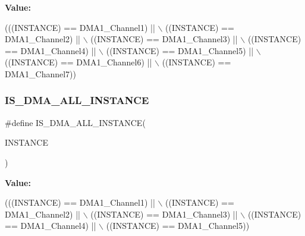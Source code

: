 {\bfseries Value\+:}
\begin{DoxyCode}
(((INSTANCE) == DMA1\_Channel1) || \(\backslash\)
                                       ((INSTANCE) == DMA1\_Channel2) || \(\backslash\)
                                       ((INSTANCE) == DMA1\_Channel3) || \(\backslash\)
                                       ((INSTANCE) == DMA1\_Channel4) || \(\backslash\)
                                       ((INSTANCE) == DMA1\_Channel5) || \(\backslash\)
                                       ((INSTANCE) == DMA1\_Channel6) || \(\backslash\)
                                       ((INSTANCE) == DMA1\_Channel7))
\end{DoxyCode}
\mbox{\label{group___exported__macro_ga40beb02b397c5f47e22a83fc28034afe}} 
\subsubsection{\texorpdfstring{I\+S\+\_\+\+D\+M\+A\+\_\+\+A\+L\+L\+\_\+\+I\+N\+S\+T\+A\+N\+CE}{IS\_DMA\_ALL\_INSTANCE}\hspace{0.1cm}{\footnotesize\ttfamily [11/16]}}
{\footnotesize\ttfamily \#define I\+S\+\_\+\+D\+M\+A\+\_\+\+A\+L\+L\+\_\+\+I\+N\+S\+T\+A\+N\+CE(\begin{DoxyParamCaption}\item[{}]{I\+N\+S\+T\+A\+N\+CE }\end{DoxyParamCaption})}

{\bfseries Value\+:}
\begin{DoxyCode}
(((INSTANCE) == DMA1\_Channel1) || \(\backslash\)
                                       ((INSTANCE) == DMA1\_Channel2) || \(\backslash\)
                                       ((INSTANCE) == DMA1\_Channel3) || \(\backslash\)
                                       ((INSTANCE) == DMA1\_Channel4) || \(\backslash\)
                                       ((INSTANCE) == DMA1\_Channel5))
\end{DoxyCode}
\mbox{\label{group___exported__macro_ga40beb02b397c5f47e22a83fc28034afe}} 
